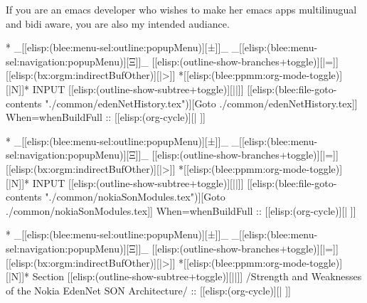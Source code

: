 \begin{whenOrg}
\begin{verblatex}
\begin{frame}[fragile,plain,label=intendedAudiance]
{    If you are an emacs developer who wishes to make her emacs apps multilinugual and bidi aware,
    you are also my intended audiance.
  }


\end{frame}
\end{verblatex}


\begin{whenOrg}
*  _[[elisp:(blee:menu-sel:outline:popupMenu)][±]]_ _[[elisp:(blee:menu-sel:navigation:popupMenu)][Ξ]]_ [[elisp:(outline-show-branches+toggle)][|=]] [[elisp:(bx:orgm:indirectBufOther)][|>]] *[[elisp:(blee:ppmm:org-mode-toggle)][|N]]*  INPUT      [[elisp:(outline-show-subtree+toggle)][||]]   [[elisp:(blee:file-goto-contents "./common/edenNetHistory.tex")][Goto ./common/edenNetHistory.tex]] When=whenBuildFull ::  [[elisp:(org-cycle)][| ]]
\end{whenOrg}
\begin{whenBuildFull}

\end{whenBuildFull}

\begin{whenOrg}
*  _[[elisp:(blee:menu-sel:outline:popupMenu)][±]]_ _[[elisp:(blee:menu-sel:navigation:popupMenu)][Ξ]]_ [[elisp:(outline-show-branches+toggle)][|=]] [[elisp:(bx:orgm:indirectBufOther)][|>]] *[[elisp:(blee:ppmm:org-mode-toggle)][|N]]*  INPUT      [[elisp:(outline-show-subtree+toggle)][||]]   [[elisp:(blee:file-goto-contents "./common/nokiaSonModules.tex")][Goto ./common/nokiaSonModules.tex]] When=whenBuildFull ::  [[elisp:(org-cycle)][| ]]
\end{whenOrg}
\begin{whenBuildFull}

\end{whenBuildFull}


\begin{whenOrg}
*  _[[elisp:(blee:menu-sel:outline:popupMenu)][±]]_ _[[elisp:(blee:menu-sel:navigation:popupMenu)][Ξ]]_ [[elisp:(outline-show-branches+toggle)][|=]] [[elisp:(bx:orgm:indirectBufOther)][|>]] *[[elisp:(blee:ppmm:org-mode-toggle)][|N]]*  Section    [[elisp:(outline-show-subtree+toggle)][||]]   /Strength and Weaknesses of the Nokia EdenNet SON Architecture/ ::  [[elisp:(org-cycle)][| ]]
\end{whenOrg}


\end{whenOrg}
